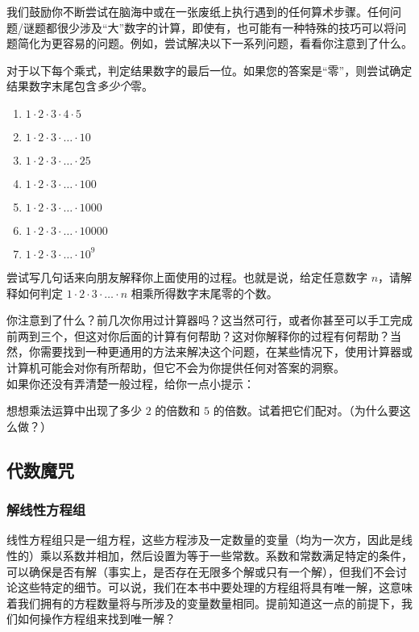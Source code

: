 我们鼓励你不断尝试在脑海中或在一张废纸上执行遇到的任何算术步骤。任何问题/谜题都很少涉及“大”数字的计算，即使有，也可能有一种特殊的技巧可以将问题简化为更容易的问题。例如，尝试解决以下一系列问题，看看你注意到了什么。

\begin{problem}
    对于以下每个乘式，判定结果数字的最后一位。如果您的答案是“零”，则尝试确定结果数字末尾包含\textit{多少个}零。
    \begin{enumerate}
        \item $1 \cdot 2 \cdot 3 \cdot 4 \cdot 5$
        \item $1 \cdot 2 \cdot 3 \cdot \dots \cdot 10$
        \item $1 \cdot 2 \cdot 3 \cdot \dots \cdot 25$
        \item $1 \cdot 2 \cdot 3 \cdot \dots \cdot 100$
        \item $1 \cdot 2 \cdot 3 \cdot \dots \cdot 1000$
        \item $1 \cdot 2 \cdot 3 \cdot \dots \cdot 10000$
        \item $1 \cdot 2 \cdot 3 \cdot \dots \cdot 10^9$
    \end{enumerate}
    尝试写几句话来向朋友解释你上面使用的过程。也就是说，给定任意数字 $n$，请解释如何判定 $1\cdot2\cdot3\cdot \dots \cdot n$ 相乘所得数字末尾零的个数。
\end{problem}

你注意到了什么？前几次你用过计算器吗？这当然可行，或者你甚至可以手工完成前两到三个，但这对你后面的计算有何帮助？这对你解释你的过程有何帮助？当然，你需要找到一种更通用的方法来解决这个问题，在某些情况下，使用计算器或计算机可能会对你有所帮助，但它不会为你提供任何对答案的洞察。\\
如果你还没有弄清楚一般过程，给你一点小提示：
\begin{hint}
    想想乘法运算中出现了多少 $2$ 的倍数和 $5$ 的倍数。试着把它们配对。（为什么要这么做？）
\end{hint}

\subsection{代数魔咒}

\subsubsection*{解线性方程组}

线性方程组只是一组方程，这些方程涉及一定数量的变量（均为一次方，因此是线性的）乘以系数并相加，然后设置为等于一些常数。系数和常数满足特定的条件，可以确保是否有解（事实上，是否存在无限多个解或只有一个解），但我们不会讨论这些特定的细节。可以说，我们在本书中要处理的方程组将具有唯一解，这意味着我们拥有的方程数量将与所涉及的变量数量相同。提前知道这一点的前提下，我们如何操作方程组来找到唯一解？

